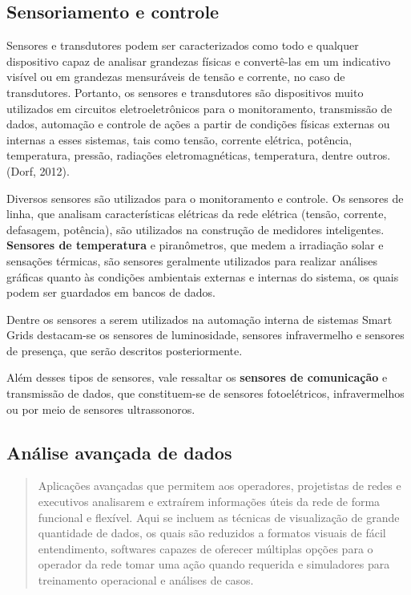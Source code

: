 \subsection{Sensoriamento e controle}
Sensores e transdutores podem ser caracterizados como todo e qualquer dispositivo capaz de analisar grandezas físicas e convertê-las em um indicativo visível ou em grandezas mensuráveis de tensão e corrente, no caso de transdutores. Portanto, os sensores e transdutores são dispositivos muito utilizados em circuitos eletroeletrônicos para o monitoramento, transmissão de dados, automação e controle de ações a partir de condições físicas externas ou internas a esses sistemas, tais como tensão, corrente elétrica, potência, temperatura, pressão, radiações eletromagnéticas, temperatura, dentre outros.(Dorf, 2012).

Diversos sensores são utilizados para o monitoramento e controle. Os sensores de linha, que analisam características elétricas da rede elétrica (tensão, corrente, defasagem, potência), são utilizados na construção de medidores inteligentes. \textbf{Sensores de temperatura} e piranômetros, que medem a irradiação solar e sensações térmicas, são sensores geralmente utilizados para realizar análises gráficas quanto às condições ambientais externas e internas do sistema, os quais podem ser guardados em bancos de dados.

Dentre os sensores a serem utilizados na automação interna de sistemas Smart Grids destacam-se os sensores de luminosidade, sensores infravermelho e sensores de presença, que serão descritos posteriormente.

Além desses tipos de sensores, vale ressaltar os \textbf{sensores de comunicação} e transmissão de dados, que constituem-se de sensores fotoelétricos, infravermelhos ou por meio de sensores ultrassonoros.


\subsection{Análise avançada de dados}
\begin{quotation}
Aplicações avançadas que permitem aos operadores, projetistas de redes e executivos analisarem e extraírem informações úteis da rede de forma funcional e flexível. Aqui se incluem as técnicas de visualização de grande quantidade de dados, os quais são reduzidos a formatos visuais de fácil entendimento, softwares capazes de oferecer múltiplas opções para o operador da rede tomar uma ação quando requerida e simuladores para treinamento operacional e análises de casos.
\end{quotation}

